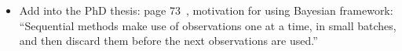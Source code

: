 \begin{itemize}
    \item Add into the PhD thesis: page 73~\cite{Bishop2006}, motivation for using Bayesian framework: ``Sequential methods make use of observations one at a time, in small batches, and then discard them before the next observations are used.''
\end{itemize}